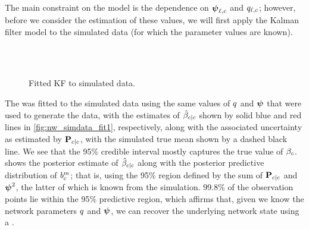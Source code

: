 The main constraint on the model is the dependence on $\mathbf{\boldsymbol{\psi}}_{\ell,c}$ and $q_{\ell,c}$; however, before we consider the estimation of these values, we will first apply the Kalman filter model to the simulated data (for which the parameter values are known).


\begin{knitrout}\small
{}\color{fgcolor}\begin{figure}

{\centering {}\\
\\

}

\caption[Fitted KF to simulated data]{Fitted KF to simulated data.}\label{fig:nw_simdata_fit}
\end{figure}


\end{knitrout}

The \kf{} was fitted to the simulated data using the same values of $q$ and $\mathbf{\boldsymbol{\psi}}$ that were used to generate the data, with the estimates of $\hat{\beta}_{c|c}$ shown by solid blue and red lines in \cref{fig:nw_simdata_fit1}, respectively, along with the associated uncertainty as estimated by $\mathbf{P}_{c|c}$, with the simulated true mean shown by a dashed black line. We see that the 95\% credible interval mostly captures the true value of $\beta_{c}$.  shows the posterior estimate of $\hat{\beta}_{c|c}$ along with the posterior predictive distribution of $b_c^m$; that is, using the 95\% region defined by the sum of $\mathbf{P}_{c|c}$ and $\mathbf{\boldsymbol{\psi}}^2$, the latter of which is known from the simulation. 99.8\% of the observation points lie within the 95\% predictive region, which affirms that, given we know the network parameters $q$ and $\mathbf{\boldsymbol{\psi}}$, we can recover the underlying network state using a \kf{}.


